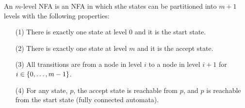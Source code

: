 \begin{definition}
  An \(m\)-level NFA is an NFA in which sthe states can be
  partitioned into \(m + 1\) levels with the following properties:
  \begin{enumerate}
    \item[(1)]
      There is exactly one state at level \(0\) and it is the start state.

    \item[(2)]
      There is exactly one state at level \(m\) and it is the accept state.

    \item[(3)]
      All transitions are from a node in level \(i\) to a node in
      level \(i + 1\) for \(i \in \left\{0, \ldots, m - 1\right\}\).

    \item[(4)]
      For any state, \(p\),
      the accept state is reachable from \(p\),
      and \(p\) is reachable from the start state
      (fully connected automata).
  \end{enumerate}
\end{definition}

